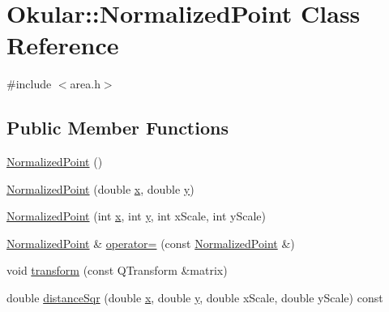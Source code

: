 \hypertarget{classOkular_1_1NormalizedPoint}{\section{Okular\+:\+:Normalized\+Point Class Reference}
\label{classOkular_1_1NormalizedPoint}
}


{\ttfamily \#include $<$area.\+h$>$}

\subsection*{Public Member Functions}
\begin{DoxyCompactItemize}
\item 
\hyperlink{classOkular_1_1NormalizedPoint_a56ad4e99f0d0a3244989a0db917d6e1b}{Normalized\+Point} ()
\item 
\hyperlink{classOkular_1_1NormalizedPoint_a9e298b60701561106b532741a715beaf}{Normalized\+Point} (double \hyperlink{classOkular_1_1NormalizedPoint_a857f49b9bc7712430d167472ef9dbd94}{x}, double \hyperlink{classOkular_1_1NormalizedPoint_ac2276daabda627d5f82bb1532c293047}{y})
\item 
\hyperlink{classOkular_1_1NormalizedPoint_a749b5411e4c23fe6a9ed831b828c9865}{Normalized\+Point} (int \hyperlink{classOkular_1_1NormalizedPoint_a857f49b9bc7712430d167472ef9dbd94}{x}, int \hyperlink{classOkular_1_1NormalizedPoint_ac2276daabda627d5f82bb1532c293047}{y}, int x\+Scale, int y\+Scale)
\item 
\hyperlink{classOkular_1_1NormalizedPoint}{Normalized\+Point} \& \hyperlink{classOkular_1_1NormalizedPoint_a48d15538208a51d67b1dd608ccd87e48}{operator=} (const \hyperlink{classOkular_1_1NormalizedPoint}{Normalized\+Point} \&)
\item 
void \hyperlink{classOkular_1_1NormalizedPoint_a5ad52e9cb2bdde31fef693e90f102bf0}{transform} (const Q\+Transform \&matrix)
\item 
double \hyperlink{classOkular_1_1NormalizedPoint_a7676a54a1a4c6ac5d5069cbbb09c7091}{distance\+Sqr} (double \hyperlink{classOkular_1_1NormalizedPoint_a857f49b9bc7712430d167472ef9dbd94}{x}, double \hyperlink{classOkular_1_1NormalizedPoint_ac2276daabda627d5f82bb1532c293047}{y}, double x\+Scale, double y\+Scale) const 
\end{DoxyCompactItemize}
